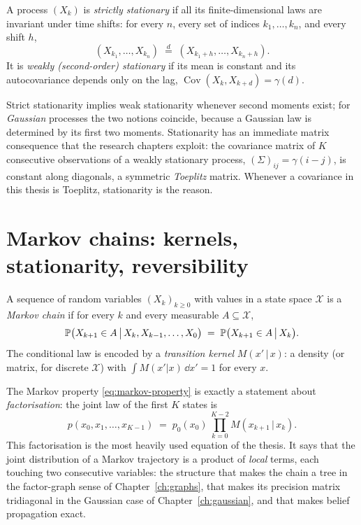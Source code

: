 \begin{definition}\label{def:stationarity}
A process $(X_k)$ is \emph{strictly stationary} if all its
finite-dimensional laws are invariant under time shifts: for every $n$,
every set of indices $k_1, \dots, k_n$, and every shift $h$,
\begin{equation*}
  (X_{k_1}, \dots, X_{k_n})
  \;\stackrel{d}{=}\;
  (X_{k_1 + h}, \dots, X_{k_n + h}) .
\end{equation*}
It is \emph{weakly (second-order) stationary} if its mean is constant and
its autocovariance depends only on the lag,
$\operatorname{Cov}(X_k, X_{k+d}) = \gamma(d)$.
\end{definition}

Strict stationarity implies weak stationarity whenever second moments
exist; for \emph{Gaussian} processes the two notions coincide, because a
Gaussian law is determined by its first two moments. Stationarity has an
immediate matrix consequence that the research chapters exploit: the
covariance matrix of $K$ consecutive observations of a weakly stationary
process, $(\Sigma)_{ij} = \gamma(i - j)$, is constant along diagonals, a
symmetric \emph{Toeplitz} matrix. Whenever a covariance in this thesis is
Toeplitz, stationarity is the reason.

\section{Markov chains: kernels, stationarity, reversibility}
\label{sec:markov}

\begin{definition}
A sequence of random variables $(X_k)_{k \geq 0}$ with values in a state
space $\mathcal{X}$ is a \emph{Markov chain} if for every $k$ and every
measurable $A \subseteq \mathcal{X}$,
\begin{equation}
  \mathbb{P}\big(X_{k+1} \in A \,\big|\, X_k, X_{k-1}, \dots, X_0\big)
  \;=\; \mathbb{P}\big(X_{k+1} \in A \,\big|\, X_k\big) .
  \label{eq:markov-property}
\end{equation}
The conditional law is encoded by a \emph{transition kernel}
$M(x' \,|\, x)$: a density (or matrix, for discrete $\mathcal{X}$) with
$\int M(x'|x)\,\dd x' = 1$ for every $x$.
\end{definition}

The Markov property \eqref{eq:markov-property} is exactly a statement
about \emph{factorisation}: the joint law of the first $K$ states is
\begin{equation}
  p(x_0, x_1, \dots, x_{K-1})
  \;=\; p_0(x_0)\, \prod_{k=0}^{K-2} M(x_{k+1} \,|\, x_k) .
  \label{eq:chain-factorisation}
\end{equation}
This factorisation is the most heavily used equation of the thesis. It says that the joint distribution of a Markov trajectory is a
product of \emph{local} terms, each touching two consecutive variables:
the structure that makes the chain a tree in the factor-graph sense of
Chapter~\ref{ch:graphs}, that makes its precision matrix tridiagonal in
the Gaussian case of Chapter~\ref{ch:gaussian}, and that makes belief
propagation exact.


